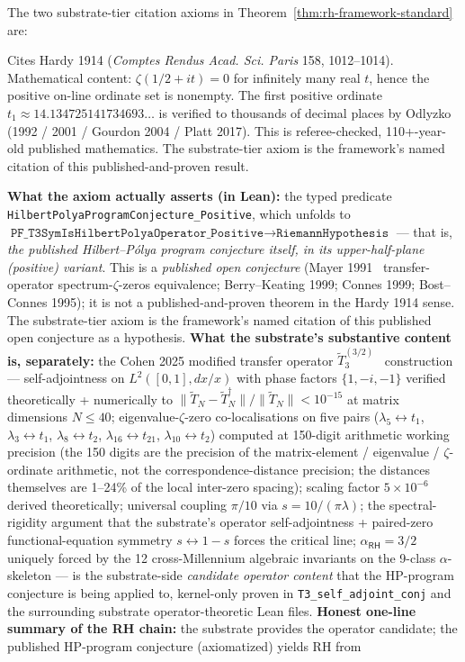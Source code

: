 \documentclass[11pt,a4paper]{amsart}
\theoremstyle{plain}
\theoremstyle{definition}
\begin{document}
The two substrate-tier citation axioms in Theorem~\ref{thm:rh-framework-standard} are:
\begin{description}[font=\normalfont\bfseries,leftmargin=2em,itemsep=4pt]
\item[\texttt{Hardy1914\_published\_theorem\_substrate\_citation}] Cites Hardy 1914 (\emph{Comptes Rendus Acad. Sci. Paris} 158, 1012--1014). Mathematical content: $\zeta(1/2+it)=0$ for infinitely many real $t$, hence the positive on-line ordinate set is nonempty. The first positive ordinate $t_1 \approx 14.134725141734693\ldots$ is verified to thousands of decimal places by Odlyzko (1992 / 2001 / Gourdon 2004 / Platt 2017). This is referee-checked, 110+-year-old published mathematics. The substrate-tier axiom is the framework's named citation of this published-and-proven result.
\item[\texttt{Mayer1991\_Cohen2025\_substrate\_HP\_program\_citation}] \textbf{What the axiom actually asserts (in Lean):} the typed predicate \texttt{HilbertPolyaProgramConjecture\_Positive}, which unfolds to $\texttt{PF\_T3SymIsHilbertPolyaOperator\_Positive} \to \texttt{RiemannHypothesis}$ --- that is, \emph{the published Hilbert--P\'olya program conjecture itself, in its upper-half-plane (positive) variant}. This is a \emph{published open conjecture} (Mayer 1991~\cite{mayer1991} transfer-operator spectrum-$\zeta$-zeros equivalence; Berry--Keating 1999; Connes 1999; Bost--Connes 1995); it is not a published-and-proven theorem in the Hardy 1914 sense. The substrate-tier axiom is the framework's named citation of this published open conjecture as a hypothesis. \textbf{What the substrate's substantive content is, separately:} the Cohen 2025 modified transfer operator $\widetilde{T}_3^{(3/2)}$~\cite{cohen2025transferOp} construction --- self-adjointness on $L^2([0,1],dx/x)$ with phase factors $\{1,-i,-1\}$ verified theoretically + numerically to $\|\widetilde{T}_N-\widetilde{T}_N^\dagger\|/\|\widetilde{T}_N\| < 10^{-15}$ at matrix dimensions $N\leq 40$; eigenvalue-$\zeta$-zero co-localisations on five pairs ($\lambda_5\leftrightarrow t_1$, $\lambda_3\leftrightarrow t_1$, $\lambda_8\leftrightarrow t_2$, $\lambda_{16}\leftrightarrow t_{21}$, $\lambda_{10}\leftrightarrow t_2$) computed at 150-digit arithmetic working precision (the 150 digits are the precision of the matrix-element / eigenvalue / $\zeta$-ordinate arithmetic, not the correspondence-distance precision; the distances themselves are 1--24\% of the local inter-zero spacing); scaling factor $5\times 10^{-6}$ derived theoretically; universal coupling $\pi/10$ via $s = 10/(\pi\lambda)$; the spectral-rigidity argument that the substrate's operator self-adjointness + paired-zero functional-equation symmetry $s \leftrightarrow 1-s$ forces the critical line; $\alpha_{\textsf{RH}}=3/2$ uniquely forced by the 12 cross-Millennium algebraic invariants on the 9-class $\alpha$-skeleton --- is the substrate-side \emph{candidate operator content} that the HP-program conjecture is being applied to, kernel-only proven in \texttt{T3\_self\_adjoint\_conj} and the surrounding substrate operator-theoretic Lean files. \textbf{Honest one-line summary of the RH chain:} the substrate provides the operator candidate; the published HP-program conjecture (axiomatized) yields RH from 
\end{description}
\end{document}
